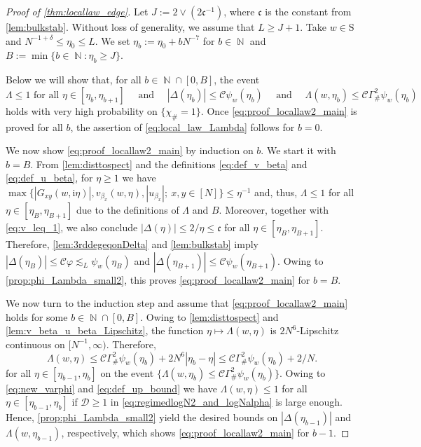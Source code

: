 \documentclass[11pt]{article}
\DeclareMathOperator{\NN}{\mathbb{N}}
\newcommand{\ii}{\mathrm{i}}
\newcommand{\abs}[1]{\left| #1 \right|}
\newcommand{\ccc}{\mathfrak{c}}
\theoremstyle{plain}
\theoremstyle{remark}
\numberwithin{equation}{section}
\begin{document}
	
	\begin{proof}[Proof of \cref{thm:locallaw_edge}]
		Let $J:=2\vee (2 \ccc^{-1})$, where $\ccc$ is the constant from \cref{lem:bulkstab}.
		Without loss of generality, we assume that $L \geq J  +1$.  
		Take $w \in \mathrm{S}$ and $N^{-1+ \delta} \le \eta_0 \le L $. 
		We set $\eta_b:= \eta_0 + bN^{-7} $ for $b \in \NN$ and $B:= \min\{ b\in \NN: \eta_b \ge  J \}$. 
		
		
		Below we will show that, for all $b \in \NN \cap [0,B]$, the event 
		\begin{equation} \label{eq:proof_locallaw2_main} 
			 \Lambda \leq 1 \text{ for all } \eta \in [\eta_b,\eta_{b+1}] \quad \text{ and } \quad 
			\abs{\Delta(\eta_b)} \leq \mathcal C \psi_w(\eta_b) \quad \text{ and } \quad
			\Lambda(w,\eta_b) \leq \mathcal C \Gamma_{\#}^2 \psi_w(\eta_b) 
		\end{equation} 
		holds 
		with very high probability on $\{ \chi_{\#} = 1\}$. 
		Once \eqref{eq:proof_locallaw2_main} is proved for all $b$, the assertion of \cref{eq:local_law_Lambda} follows for $b=0$. 
		
		We now show \eqref{eq:proof_locallaw2_main} by induction on $b$. We start it with $b = B$. 
		From \cref{lem:disttospect} and the definitions \eqref{eq:def_v_beta} and \eqref{eq:def_u_beta}, for $\eta \ge 1$ we have $ \max\{\abs{G_{xy}(w, \ii \eta)}, v_{\beta_x}(w,\eta),\abs{u_{\beta_x}} ; ~x,y \in [N]\}\leq \eta^{-1}$ and, thus, $ \Lambda \leq 1$ for all $\eta \in [\eta_B,\eta_{B+1}]$ due to the definitions of $\Lambda$ and $B$.
		Moreover, together with \eqref{eq:v_leq_1}, we also conclude $\abs{\Delta(\eta)} \leq 2/\eta \leq \ccc$ for all $\eta \in [\eta_B,\eta_{B+1}]$. Therefore, 
		\cref{lem:3rddegeqonDelta} and \cref{lem:bulkstab} imply $\abs{\Delta(\eta_{B}) }\le \mathcal C \varphi \lesssim_L \psi_w(\eta_B)$ and $\abs{\Delta(\eta_{B+1})}\leq \mathcal C \psi_w(\eta_{B+1})$. Owing to \cref{prop:phi_Lambda_small2}, this proves \eqref{eq:proof_locallaw2_main} for $b =B$. 
		
		
		We now turn to the induction step and assume that \eqref{eq:proof_locallaw2_main} holds for some $b \in \NN\cap [0,B]$. Owing to \cref{lem:disttospect} and \cref{lem:v_beta_u_beta_Lipschitz}, the function $\eta \mapsto \Lambda(w,\eta)$ 
		is $ 2  N^6$-Lipschitz continuous on $[N^{-1},\infty)$. Therefore, 
		\begin{equation} \label{eq:Lambda_small_Lipschitz_2} 
			\Lambda(w,\eta) \le \mathcal{C}\Gamma_{\#}^2\psi_w(\eta_{b}) +  2  N^6 \abs{\eta_{b} - \eta} \le \mathcal{C}\Gamma_{\#}^2\psi_w(\eta_{b}) + 2/N.
		\end{equation}
		for all $\eta \in [\eta_{b-1},\eta_{b}]$ on the event $\{ \Lambda(w,\eta_b) \leq \mathcal C \Gamma_{\#}^2\psi_w(\eta_{b}) \}$. Owing to \eqref{eq:new_varphi} and \eqref{eq:def_up_bound} we have $\Lambda(w,\eta) \leq 1$ for all $\eta \in [\eta_{b-1},\eta_{b}]$ if $\mathcal{D}\geq 1$ in \eqref{eq:regimedlogN2_and_logNalpha} is large enough. Hence, \cref{prop:phi_Lambda_small2} yield the desired bounds on $\abs{\Delta(\eta_{b-1})}$ and $\Lambda(w,\eta_{b-1})$, respectively, which shows \eqref{eq:proof_locallaw2_main} for $b-1$. 
		

\end{proof}
\end{document}
